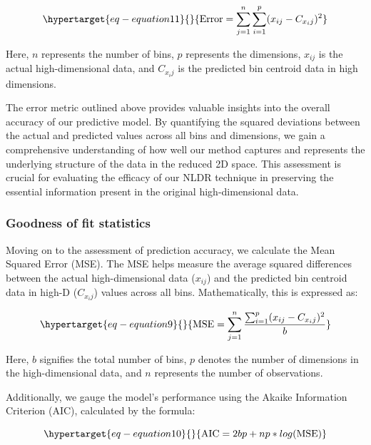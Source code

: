 \documentclass[
  12pt]{article}
\begin{document}
\begin{equation}\protect\hypertarget{eq-equation11}{}{
\text{Error} = \sum_{j = 1}^{n}\sum_{i = 1}^{p} (x_{ij} - C_{x_ij})^2
}\label{eq-equation11}\end{equation}

Here, \(n\) represents the number of bins, \(p\) represents the
dimensions, \(x_{ij}\) is the actual high-dimensional data, and
\(C_{x_ij}\) is the predicted bin centroid data in high dimensions.

The error metric outlined above provides valuable insights into the
overall accuracy of our predictive model. By quantifying the squared
deviations between the actual and predicted values across all bins and
dimensions, we gain a comprehensive understanding of how well our method
captures and represents the underlying structure of the data in the
reduced 2D space. This assessment is crucial for evaluating the efficacy
of our NLDR technique in preserving the essential information present in
the original high-dimensional data.

\hypertarget{goodness-of-fit-statistics}{%
\subsubsection{Goodness of fit
statistics}\label{goodness-of-fit-statistics}}

Moving on to the assessment of prediction accuracy, we calculate the
Mean Squared Error (MSE). The MSE helps measure the average squared
differences between the actual high-dimensional data (\(x_{ij}\)) and
the predicted bin centroid data in high-D (\(C_{x_ij}\)) values across
all bins. Mathematically, this is expressed as:

\begin{equation}\protect\hypertarget{eq-equation9}{}{
\text{MSE} = \sum_{j = 1}^{n} \frac{\sum_{i = 1}^{p} (x_{ij} - C_{x_ij})^2}{b}
}\label{eq-equation9}\end{equation}

Here, \(b\) signifies the total number of bins, \(p\) denotes the number
of dimensions in the high-dimensional data, and \(n\) represents the
number of observations.

Additionally, we gauge the model's performance using the Akaike
Information Criterion (AIC), calculated by the formula:

\begin{equation}\protect\hypertarget{eq-equation10}{}{
\text{AIC} = 2bp + np * log(\text{MSE})
}\label{eq-equation10}\end{equation}
\end{document}
